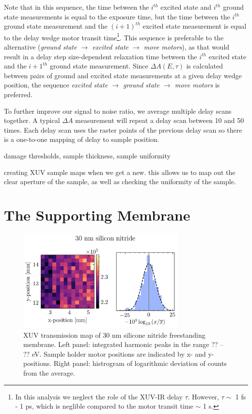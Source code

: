 Note that in this sequence, the time between the $i^{th}$ excited state and $i^{th}$ ground state measurements is equal to the exposure time, but the time between the $i^{th}$ ground state measurement and the $(i+1)^{th}$ excited state measurement is equal to the delay wedge motor transit time\footnote{In this analysis we neglect the role of the XUV-IR delay $\tau$. However, $\tau \sim$ 1 fs - 1 ps, which is neglible compared to the motor transit time $\sim$ 1 s.}. This sequence is preferable to the alternative (\textit{ground state $\rightarrow$ excited state $\rightarrow$ move motors}), as that would result in a delay step size-dependent relaxation time between the $i^{th}$ excited state and the $i+1^{th}$ ground state measurement. Since $\Delta A(E,\tau)$ is calculated between pairs of ground and excited state measurements at a given delay wedge position, the sequence \textit{excited state $\rightarrow$ ground state $\rightarrow$ move motors} is preferred.



To further improve our signal to noise ratio, we average multiple delay scans together. A typical $\Delta A$ measurement will repeat a delay scan between 10 and 50 times. Each delay scan uses the raster points of the previous delay scan so there is a one-to-one mapping of delay to sample position.



damage thresholds, sample thickness, sample uniformity

creating XUV sample maps when we get a new. this allows us to map out the clear aperture of the sample, as well as checking the uniformity of the sample.

\section{The Supporting Membrane}

\begin{figure}
	\centering
	\includegraphics[width=0.75\textwidth]{figures/chap3/nitride_map.png}
	\caption{XUV transmission map of 30 nm silicone nitride freestanding membrane. Left panel: integrated harmonic peaks in the range ?? -- ?? eV. Sample holder motor positions are indicated by x- and y-positions. Right panel: histrogram of logarithmic deviation of counts from the average.}
	\label{fig:nitride_map}
\end{figure}

